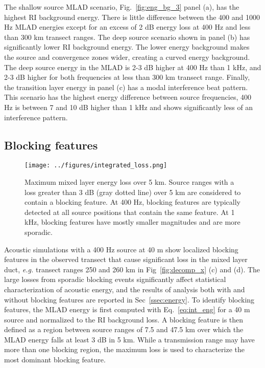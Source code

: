 \documentclass[preprint,NumberedRefs]{JASA}
\begin{document}
The shallow source MLAD scenario, Fig.~\ref{fig:eng_bg_3} panel (a), has the highest RI background energy. There is little difference between the 400 and 1000 Hz MLAD energies except for an excess of 2 dB energy loss at 400 Hz and less than 300 km transect ranges. The deep source scenario shown in panel (b) has significantly lower RI background energy. The lower energy background makes the source and convergence zones wider, creating a curved energy background. The deep source energy in the MLAD is 2-3 dB higher at 400 Hz than 1 kHz, and 2-3 dB higher for both frequencies at less than 300 km transect range. Finally, the transition layer energy in panel (c) has a modal interference beat pattern. This scenario has the highest energy difference between source frequencies, 400 Hz is between 7 and 10 dB higher than 1 kHz and shows significantly less of an interference pattern.

\subsection{Blocking features}\label{ssec:blocking}
\begin{figure}
\texttt{[image: ../figures/integrated\_loss.png]}
    \caption{Maximum mixed layer energy loss over 5 km. Source ranges with a loss greater than 3 dB (gray dotted line) over 5 km are considered to contain a blocking feature. At 400 Hz, blocking features are typically detected at all source positions that contain the same feature. At 1 kHz, blocking features have mostly smaller magnitudes and are more sporadic.}
    \label{fig:blocking}
\end{figure}

Acoustic simulations with a 400 Hz source at 40 m show localized blocking features in the observed transect that cause significant loss in the mixed layer duct, \emph{e.g.} transect ranges 250 and 260 km in Fig~\ref{fig:decomp_x} (c) and (d). The large losses from sporadic blocking events significantly affect statistical characterization of acoustic energy, and the results of analysis both with and without blocking features are reported in Sec~\ref{ssec:energy}. To identify blocking features, the MLAD energy is first computed with Eq.~\eqref{eq:int_eng} for a 40 m source and normalized to the RI background loss. A blocking feature is then defined as a region between source ranges of 7.5 and 47.5 km over which the MLAD energy falls at least 3 dB in 5 km. While a transmission range may have more than one blocking region, the maximum loss is used to characterize the most dominant blocking feature.
\end{document}
